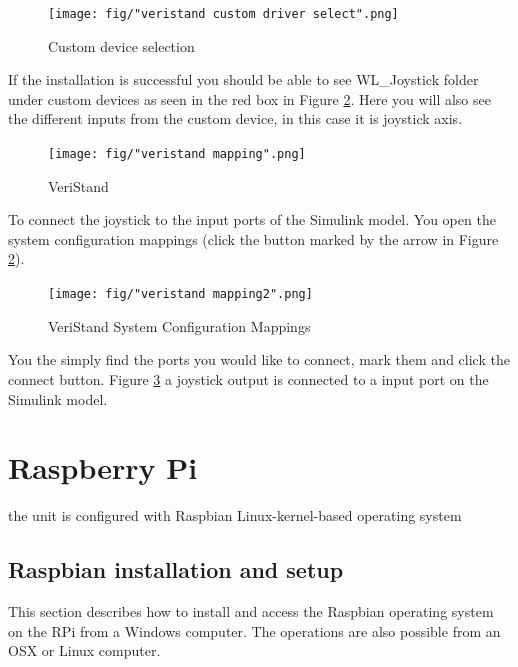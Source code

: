 \documentclass[a4paper,twoside,english]{report}
\begin{document}
\begin{figure}[!h]
\centering \texttt{[image: fig/"veristand custom driver select".png]}
\caption{Custom device selection}

\label{fig: custom device selection} 
\end{figure}

If the installation is successful you should be able to see WL\_Joystick
folder under custom devices as seen in the red box in Figure \ref{fig: veristand confirmation}.
Here you will also see the different inputs from the custom device,
in this case it is joystick axis.

\begin{figure}[!h]
\centering \texttt{[image: fig/"veristand mapping".png]}
\caption{VeriStand}

\label{fig: veristand confirmation} 
\end{figure}

To connect the joystick to the input ports of the Simulink model.
You open the system configuration mappings (click the button marked
by the arrow in Figure \ref{fig: veristand confirmation}).

\begin{figure}[!h]
\centering \texttt{[image: fig/"veristand mapping2".png]}
\caption{VeriStand System Configuration Mappings}

\label{fig: veristand mappings} 
\end{figure}

You the simply find the ports you would like to connect, mark them
and click the connect button. Figure \ref{fig: veristand mappings}
a joystick output is connected to a input port on the Simulink model.

\clearpage{}

\section{\label{subsec: RPi setup}Raspberry Pi}

the unit is configured with Raspbian Linux-kernel-based operating
system 

\subsection{Raspbian installation and setup}

This section describes how to install and access the Raspbian operating
system on the RPi from a Windows computer. The operations are also
possible from an OSX or Linux computer.
\end{document}
